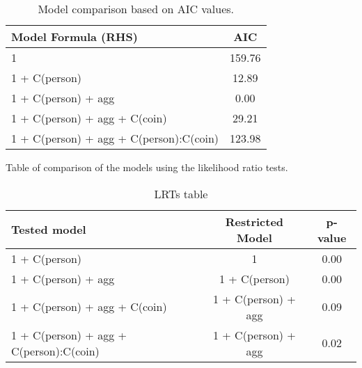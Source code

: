 \documentclass[a4paper, 12pt,oneside]{article}
\begin{document}
			\begin{table}[htb]
				\centering
				\caption{Model comparison based on AIC values.}
				\label{tab:model-comparison}
				\begin{tabular}{lc}
				\toprule
				Model Formula (RHS) & AIC \\
				\midrule
				1 & 159.76 \\
				1 + C(person) & 12.89 \\
				1 + C(person) + agg & 0.00 \\
				1 + C(person) + agg + C(coin) & 29.21 \\
				1 + C(person) + agg + C(person):C(coin) & 123.98 \\
				\bottomrule
				\end{tabular}
			\end{table}

			Table of comparison of the models using the likelihood ratio tests. 

			\begin{table}[htb]
				\caption{LRTs table}
				\label{tab:LRT-model-comparison}
				\begin{tabular}{lcc}
				\toprule
				Tested model & Restricted Model & p-value \\
				\midrule
				1 + C(person) & 1 & 0.00 \\
				1 + C(person) + agg & 1 + C(person) & 0.00 \\
				1 + C(person) + agg + C(coin) & 1 + C(person) + agg & 0.09 \\
				1 + C(person) + agg + C(person):C(coin) & 1 + C(person) + agg & 0.02 \\
				\bottomrule
				\end{tabular}
				\end{table}
\end{document}
